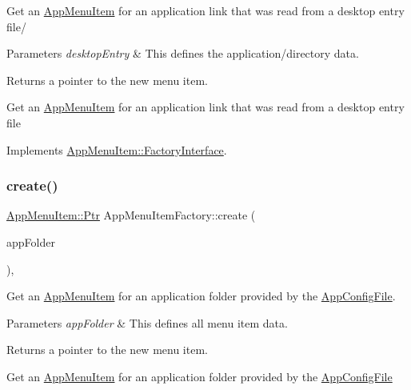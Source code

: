 Get an \mbox{\hyperlink{classAppMenuItem}{App\+Menu\+Item}} for an application link that was read from a desktop entry file/


\begin{DoxyParams}{Parameters}
{\em desktop\+Entry} & This defines the application/directory data.\\
\hline
\end{DoxyParams}
\begin{DoxyReturn}{Returns}
a pointer to the new menu item.
\end{DoxyReturn}
Get an \mbox{\hyperlink{classAppMenuItem}{App\+Menu\+Item}} for an application link that was read from a desktop entry file 

Implements \mbox{\hyperlink{classAppMenuItem_1_1FactoryInterface_ab4a62330cdbb3e4a0864f354ceb3396f}{App\+Menu\+Item\+::\+Factory\+Interface}}.

\mbox{\label{classAppMenuItemFactory_a39e1a6e96d7c22413cb396a46b496804}} 
\subsubsection{\texorpdfstring{create()}{create()}\hspace{0.1cm}{\footnotesize\ttfamily [3/3]}}
{\footnotesize\ttfamily \mbox{\hyperlink{classAppMenuItem_ab5f51c5d74f8df62b8862c0cc8126cb7}{App\+Menu\+Item\+::\+Ptr}} App\+Menu\+Item\+Factory\+::create (\begin{DoxyParamCaption}\item[{const \mbox{\hyperlink{structAppConfigFile_1_1AppFolder}{App\+Config\+File\+::\+App\+Folder}} \&}]{app\+Folder }\end{DoxyParamCaption})\hspace{0.3cm}{\ttfamily [override]}, {\ttfamily [virtual]}}

Get an \mbox{\hyperlink{classAppMenuItem}{App\+Menu\+Item}} for an application folder provided by the \mbox{\hyperlink{classAppConfigFile}{App\+Config\+File}}.


\begin{DoxyParams}{Parameters}
{\em app\+Folder} & This defines all menu item data.\\
\hline
\end{DoxyParams}
\begin{DoxyReturn}{Returns}
a pointer to the new menu item.
\end{DoxyReturn}
Get an \mbox{\hyperlink{classAppMenuItem}{App\+Menu\+Item}} for an application folder provided by the \mbox{\hyperlink{classAppConfigFile}{App\+Config\+File}} 

